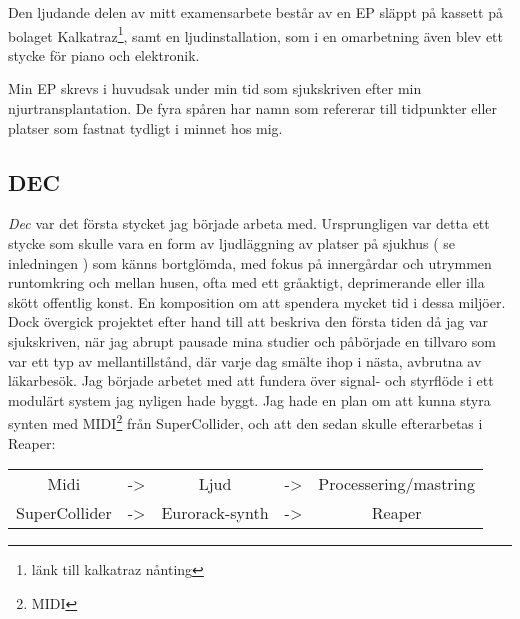 \documentclass{article}
\begin{document}
  Den ljudande delen av mitt examensarbete består av en EP släppt på kassett på bolaget
  Kalkatraz\footnote{länk till kalkatraz nånting}, samt en ljudinstallation, som i en omarbetning även blev
  ett stycke för piano och elektronik.

  Min EP skrevs i huvudsak under min tid som sjukskriven efter min njurtransplantation. De fyra spåren har
  namn som refererar till tidpunkter eller platser som fastnat tydligt i minnet hos mig. 
	\subsection{DEC}
	\emph{Dec} var det första stycket jag började arbeta med. Ursprungligen var detta ett stycke som skulle
	vara en form av ljudläggning av platser på sjukhus ( se inledningen ) som känns bortglömda, med fokus på
	innergårdar och utrymmen runtomkring och mellan husen, ofta med ett gråaktigt, deprimerande eller illa
	skött offentlig konst. En komposition om att spendera mycket tid i dessa miljöer. Dock övergick projektet
	efter hand till att beskriva den första tiden då jag var sjukskriven, när jag abrupt pausade mina studier
	och påbörjade en tillvaro som var ett typ av mellantillstånd, där varje dag smälte ihop i nästa, avbrutna
	av läkarbesök.
		Jag började arbetet med att fundera över signal- och styrflöde i ett modulärt system jag nyligen hade
		byggt. Jag hade en plan om att kunna styra synten med MIDI\footnote{MIDI} från SuperCollider, och att
		den sedan skulle efterarbetas i Reaper:
		\begin{center}
			\begin{tabular}{ c c c c c }
				Midi		  & -> & Ljud			& -> & Processering/mastring \\
				SuperCollider & -> & Eurorack-synth & -> & Reaper
			\end{tabular}
		\end{center}
\end{document}
